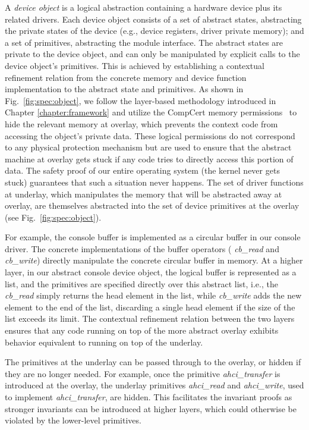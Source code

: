 A {\it device object} is a logical abstraction containing a hardware device plus
its related drivers. Each device object consists of a set of abstract states,
abstracting the private states of the device (e.g., device registers, driver
private memory); and a set of primitives, abstracting the module interface. The
abstract states are private to the device object, and can only be manipulated by
explicit calls to the device object's primitives. This is achieved by
establishing a contextual refinement relation from the concrete memory and
device function implementation to the abstract state and primitives. As shown in
Fig.~\ref{fig:spec:object}, we follow the layer-based methodology introduced in
Chapter \ref{chapter:framework}
and utilize the CompCert memory permissions~\cite{leroy08} to hide the relevant
memory at overlay, which prevents the context code from accessing the object's
private data. These logical permissions do not correspond to any physical
protection mechanism but are used to ensure that the abstract machine at
overlay gets stuck if any code tries to directly access this portion of data.
The safety proof of our entire operating system (the kernel never gets stuck)
guarantees that such a situation never happens.  The set of driver functions at
underlay, which manipulates the memory that will be abstracted away at overlay,
are themselves abstracted into the set of device primitives at the overlay (see
Fig.~\ref{fig:spec:object}).

For example, the console buffer is implemented as a circular buffer in our
console driver.  The concrete implementations of the buffer operators ({\it
	cb\_read} and {\it cb\_write}) directly manipulate the concrete circular
buffer in memory. At a higher layer, in our abstract console device object, the
logical buffer is represented as a list, and the primitives are specified
directly over this abstract list, i.e., the {\it cb\_read} simply returns the
head element in the list, while {\it cb\_write} adds the new element to the end
of the list, discarding a single head element if the size of the list exceeds
its limit.  The contextual refinement relation between the two layers ensures
that any code running on top of the more abstract overlay exhibits behavior
equivalent to running on top of the underlay.

The primitives at the underlay can be passed through to the overlay, or hidden
if they are no longer needed.  For example, once the primitive {\it
	ahci\_transfer} is introduced at the overlay, the underlay primitives {\it
	ahci\_read} and {\it ahci\_write}, used to implement {\it ahci\_transfer}, are
hidden. This facilitates the invariant proofs as stronger invariants can be
introduced at higher layers, which could otherwise be violated by the
lower-level primitives.

